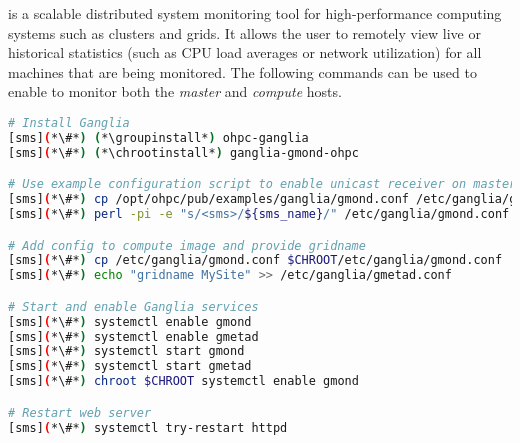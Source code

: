 \Ganglia{} is a scalable distributed system monitoring tool for high-performance
computing systems such as clusters and grids. It allows the user to remotely
view live or historical statistics (such as CPU load averages or network
utilization) for all machines that are being monitored. The following commands
can be used to enable \Ganglia{} to monitor both the {\em master} and {\em
compute} hosts.

\begin{lstlisting}[language=bash,keywords={},upquote=true]
# Install Ganglia
[sms](*\#*) (*\groupinstall*) ohpc-ganglia
[sms](*\#*) (*\chrootinstall*) ganglia-gmond-ohpc

# Use example configuration script to enable unicast receiver on master host
[sms](*\#*) cp /opt/ohpc/pub/examples/ganglia/gmond.conf /etc/ganglia/gmond.conf
[sms](*\#*) perl -pi -e "s/<sms>/${sms_name}/" /etc/ganglia/gmond.conf

# Add config to compute image and provide gridname 
[sms](*\#*) cp /etc/ganglia/gmond.conf $CHROOT/etc/ganglia/gmond.conf
[sms](*\#*) echo "gridname MySite" >> /etc/ganglia/gmetad.conf

# Start and enable Ganglia services
[sms](*\#*) systemctl enable gmond
[sms](*\#*) systemctl enable gmetad
[sms](*\#*) systemctl start gmond
[sms](*\#*) systemctl start gmetad
[sms](*\#*) chroot $CHROOT systemctl enable gmond

# Restart web server
[sms](*\#*) systemctl try-restart httpd
\end{lstlisting}


